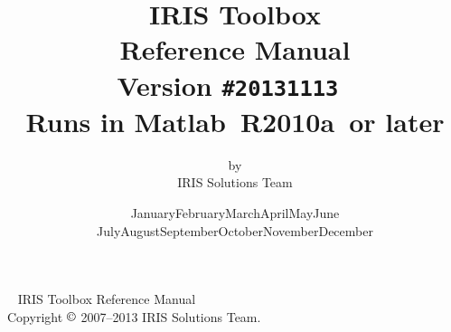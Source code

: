 \documentclass[letterpaper,fleqn,10pt]{article}
\newcommand{\mycmss}{\fontfamily{lcmss}\selectfont}
\newcommand\Today{\number\day\space \ifcase\month\or
  January\or February\or March\or April\or May\or June\or
  July\or August\or September\or October\or November\or December\fi
  \space\number\year}
\newcommand{\irisversion}{20131113}
\newcommand{\matlabversion}{R2010a}
\begin{document}
\thispagestyle{empty}
\title{\vspace*{0.2\textheight}\huge\mdseries IRIS Toolbox\\Reference Manual \\[24pt] \rmfamily \large \mdseries Version \texttt{\#\irisversion}\ \\[6pt]
Runs in Matlab\raisebox{5pt}{\tiny $\copyright$}\ \matlabversion\ or later}
\author{by \\[2pt] IRIS Solutions Team}
\date{\bigskip\bigskip \Today\\[5pt]}
\maketitle
\thispagestyle{empty}
\clearpage

~
\vfill
IRIS Toolbox Reference Manual \\
Copyright $\copyright$ 2007--2013 IRIS Solutions Team.
\thispagestyle{empty}



\clearpage
{}




\clearpage
\tableofcontents

\clearpage
{}

\end{document}
